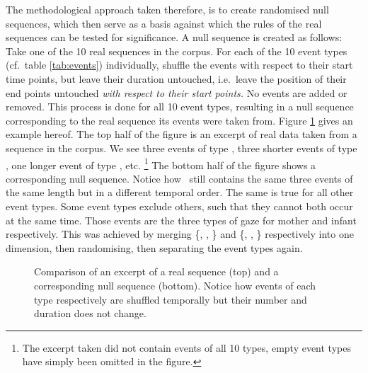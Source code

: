 The methodological approach taken therefore, is to create randomised null sequences, which then serve as a basis against which the rules of the real sequences can be tested for significance.
A null sequence is created as follows:
Take one of the 10 real sequences in the corpus.
For each of the 10 event types (cf.~table \ref{tab:events}) individually, shuffle the events with respect to their start time points, but leave their duration untouched, i.e.~leave the position of their end points untouched \emph{with respect to their start points.}
No events are added or removed.
This process is done for all 10 event types, resulting in a null sequence corresponding to the real sequence its events were taken from.
Figure \ref{fig:null} gives an example hereof.
The top half of the figure is an excerpt of real data taken from a sequence in the corpus.
We see three events of type \mosp, three shorter events of type \mogain, one longer event of type \ingamo, etc.%
\footnote{The excerpt taken did not contain events of all 10 types, empty event types have simply been omitted in the figure.}
The bottom half of the figure shows a corresponding null sequence.
Notice how \mosp\ still contains the same three events of the same length but in a different temporal order.
The same is true for all other event types.
Some event types exclude others, such that they cannot both occur at the same time.
Those events are the three types of gaze for mother and infant respectively.
This was achieved by merging \{\mogain, \mogaob, \mogaaw\} and \{\ingamo, \ingaob, \ingaaw\} respectively into one dimension, then randomising, then separating the event types again.

\begin{figure}
	\centering
	
	\caption[Real and null sequence comparison.]{Comparison of an excerpt of a real sequence (top) and a corresponding null sequence (bottom). Notice how events of each type respectively are shuffled temporally but their number and duration does not change.}
	\label{fig:null}
\end{figure}

